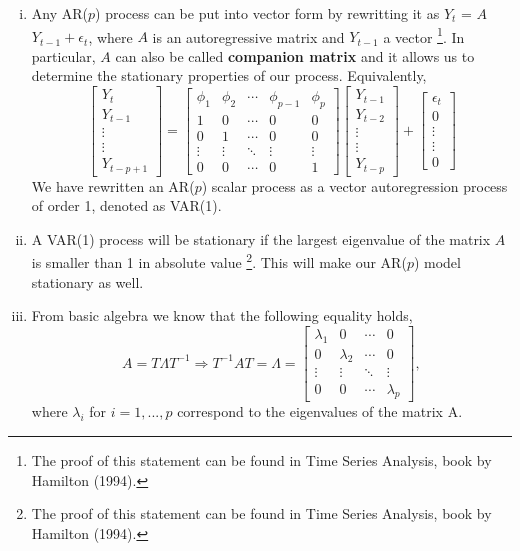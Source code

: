 \documentclass{article}
\begin{document}
\begin{enumerate}[(i)]
\item Any AR($p$) process can be put into vector form by rewritting it as $Y_t$ = $A$ $Y_{t-1} + \epsilon_t$, where $A$ is an autoregressive matrix and $Y_{t-1}$ a vector \footnote{The proof of this statement can be found in Time Series Analysis, book by Hamilton (1994).}. In particular, $A$ can also be called \textbf{companion matrix} and it allows us to determine the stationary properties of our process. Equivalently,
  \[
\begin{bmatrix}
    Y_t      \\
    Y_{t-1} \\    
    \vdots \\
    \vdots \\
    Y_{t-p+1}
\end{bmatrix}
= 
\begin{bmatrix}
    \phi_1 & \phi_2 & \cdots & \phi_{p-1} & \phi_p    \\
    1 & 0 & \cdots & 0 & 0 \\     
    0 & 1 & \cdots & 0 & 0 \\
    \vdots & \vdots & \ddots & \vdots & \vdots\\
    0 & 0 & \cdots & 0 & 1
\end{bmatrix} 
\begin{bmatrix}
    Y_{t-1}      \\
    Y_{t-2} \\    
    \vdots \\
    \vdots \\
    Y_{t-p}
\end{bmatrix}
+
\begin{bmatrix}
    \epsilon_t \\
    0 \\
    \vdots \\
    \vdots \\
    0
\end{bmatrix}
\]
We have rewritten an AR($p$) scalar process as a vector autoregression process of order 1, denoted as VAR(1). 

\item A VAR(1) process will be stationary if the largest eigenvalue of the matrix $A$ is smaller than 1 in absolute value \footnote{The proof of this statement can be found in Time Series Analysis, book by Hamilton (1994).}. This will make our AR($p$) model stationary as well. 

\item From basic algebra we know that the following equality holds, \newline
\[ A = T\Lambda T^{-1} \Rightarrow T^{-1}AT = \Lambda = \begin{bmatrix} \lambda_1 & 0 & \cdots & 0\\     
    0 & \lambda_2 & \cdots & 0 \\
    \vdots & \vdots & \ddots & \vdots \\
    0 & 0 & \cdots & \lambda_p \end{bmatrix}, \]
where $\lambda_i$ for $i = 1, ..., p$ correspond to the eigenvalues of the matrix A. 


\end{enumerate}
\end{document}
